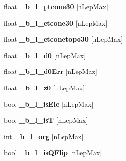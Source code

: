 \begin{DoxyCompactItemize}
\item 
\hypertarget{classToyNt_a7026079f20f2910cdc93830a325f737c}{
float {\bfseries \_\-b\_\-l\_\-ptcone30} \mbox{[}nLepMax\mbox{]}}
\label{classToyNt_a7026079f20f2910cdc93830a325f737c}

\item 
\hypertarget{classToyNt_a525b198ec1dcbe910a416e943b46c6cb}{
float {\bfseries \_\-b\_\-l\_\-etcone30} \mbox{[}nLepMax\mbox{]}}
\label{classToyNt_a525b198ec1dcbe910a416e943b46c6cb}

\item 
\hypertarget{classToyNt_aebb63953d8693051cfb4478b6210bd01}{
float {\bfseries \_\-b\_\-l\_\-etconetopo30} \mbox{[}nLepMax\mbox{]}}
\label{classToyNt_aebb63953d8693051cfb4478b6210bd01}

\item 
\hypertarget{classToyNt_a43c2bbfa347a2679b9541c100b6f9503}{
float {\bfseries \_\-b\_\-l\_\-d0} \mbox{[}nLepMax\mbox{]}}
\label{classToyNt_a43c2bbfa347a2679b9541c100b6f9503}

\item 
\hypertarget{classToyNt_ab039c8f8b81db172d99bebea84a2bf06}{
float {\bfseries \_\-b\_\-l\_\-d0Err} \mbox{[}nLepMax\mbox{]}}
\label{classToyNt_ab039c8f8b81db172d99bebea84a2bf06}

\item 
\hypertarget{classToyNt_aa57fe54ec1fc669193f8d11acdcfbcb9}{
float {\bfseries \_\-b\_\-l\_\-z0} \mbox{[}nLepMax\mbox{]}}
\label{classToyNt_aa57fe54ec1fc669193f8d11acdcfbcb9}

\item 
\hypertarget{classToyNt_ad9fff30ecda0091b61add06cd80c6b04}{
bool {\bfseries \_\-b\_\-l\_\-isEle} \mbox{[}nLepMax\mbox{]}}
\label{classToyNt_ad9fff30ecda0091b61add06cd80c6b04}

\item 
\hypertarget{classToyNt_a97c6a2354b45a8206a405928d5e41fc2}{
bool {\bfseries \_\-b\_\-l\_\-isT} \mbox{[}nLepMax\mbox{]}}
\label{classToyNt_a97c6a2354b45a8206a405928d5e41fc2}

\item 
\hypertarget{classToyNt_a6f57818e97989400205ea2372abdc091}{
int {\bfseries \_\-b\_\-l\_\-org} \mbox{[}nLepMax\mbox{]}}
\label{classToyNt_a6f57818e97989400205ea2372abdc091}

\item 
\hypertarget{classToyNt_adfc600a2b858a46bd0f601318d6cf1b9}{
bool {\bfseries \_\-b\_\-l\_\-isQFlip} \mbox{[}nLepMax\mbox{]}}
\label{classToyNt_adfc600a2b858a46bd0f601318d6cf1b9}


\end{DoxyCompactItemize}
